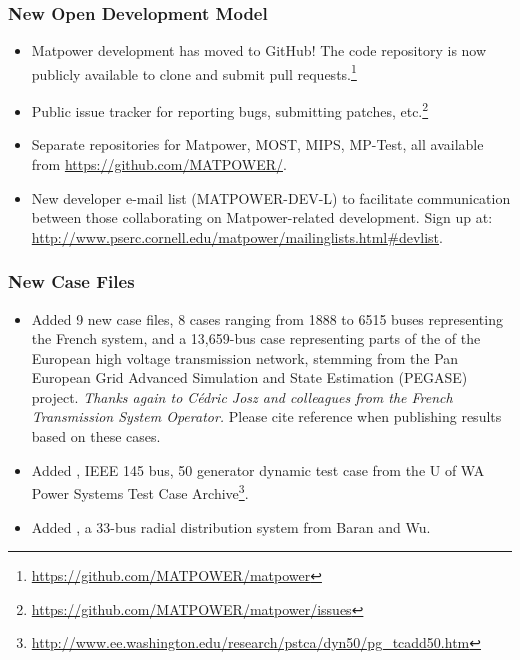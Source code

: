 \documentclass[12pt]{article}
\newcommand{\matpower}[0]{{\sc Matpower}}
\newcommand{\matpowergithuburl}[0]{https://github.com/MATPOWER/matpower}
\newcommand{\mptest}[0]{{MP-Test}}
\newcommand{\mips}[0]{{MIPS}}
\newcommand{\most}[0]{{MOST}}
\newcommand{\code}[1]{{\relsize{-0.5}{\tt{{#1}}}}}  %
\numberwithin{equation}{section}
\numberwithin{table}{section}
\numberwithin{figure}{section}
\begin{document}
\begin{appendices}
\subsubsection*{New Open Development Model}
\begin{itemize}
\item \matpower{} development has moved to GitHub! The code repository is now publicly available to clone and submit pull requests.\footnote{\url{\matpowergithuburl}}
\item Public issue tracker for reporting bugs, submitting patches, etc.\footnote{\url{\matpowergithuburl/issues}}
\item Separate repositories for \matpower{}, \most{}, \mips{}, \mptest{}, all available from \url{https://github.com/MATPOWER/}.
\item New developer e-mail list (MATPOWER-DEV-L) to facilitate communication between those collaborating on \matpower{}-related development. Sign up at:\\
\url{http://www.pserc.cornell.edu/matpower/mailinglists.html#devlist}.
\end{itemize}

\subsubsection*{New Case Files}
\begin{itemize}
\item Added 9 new case files, 8 cases ranging from 1888 to 6515 buses representing the French system, and a 13,659-bus case representing parts of the of the European high voltage transmission network, stemming from the Pan European Grid Advanced Simulation and State Estimation (PEGASE) project. \emph{Thanks again to C\'edric Josz and colleagues from the French Transmission System Operator.} Please cite reference \cite{josz2016} when publishing results based on these cases.
\item Added \code{case145.m}, IEEE 145 bus, 50 generator dynamic test case from the U of WA Power Systems Test Case Archive\footnote{\url{http://www.ee.washington.edu/research/pstca/dyn50/pg_tcadd50.htm}}.
\item Added \code{case33bw.m}, a 33-bus radial distribution system from Baran and Wu.
\end{itemize}


\end{appendices}
\end{document}
